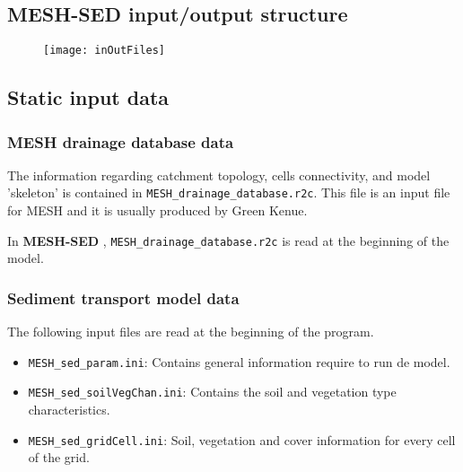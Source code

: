 \documentclass[12pt, letterpaper]{article}
\newcommand{\ms}{\textbf{MESH-SED} }
\begin{document}
\subsection{\ms input/output structure}
\begin{figure}
\texttt{[image: inOutFiles]}
\end{figure}

\subsection{Static input data}
\subsubsection{MESH drainage database data}
The information regarding catchment topology, cells connectivity, and model 'skeleton' is contained in \texttt{MESH\_drainage\_database.r2c}. This file is an input file for MESH and it is usually produced by Green Kenue.

In \ms, \texttt{MESH\_drainage\_database.r2c} is read at the beginning of the model.

\subsubsection{Sediment transport model data}
The following input files are read at the beginning of the program. 
\begin{itemize}
\item \texttt{MESH\_sed\_param.ini}: Contains general information require to run de model.
\item \texttt{MESH\_sed\_soilVegChan.ini}: Contains the soil and vegetation type characteristics.
\item \texttt{MESH\_sed\_gridCell.ini}: Soil, vegetation and cover information for every cell of the grid.
\end{itemize}
\end{document}
